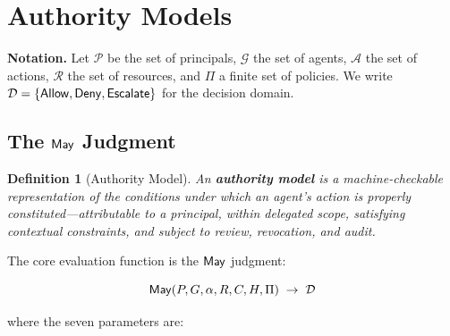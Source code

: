 \documentclass[11pt,a4paper]{article}
\newtheorem{definition}{Definition}[section]
\newcommand{\termlabel}[1]{\ifmmode\mathsf{#1}\else{\normalfont\textsc{\MakeLowercase{#1}}}\fi}
\newcommand{\May}{\termlabel{May}}
\newcommand{\Allow}{\termlabel{Allow}}
\newcommand{\Deny}{\termlabel{Deny}}
\newcommand{\Escalate}{\termlabel{Escalate}}
\begin{document}
\section{Authority Models}
\label{sec:authority}

\noindent\textbf{Notation.} Let $\mathcal{P}$ be the set of principals, $\mathcal{G}$ the set of agents, $\mathcal{A}$ the set of actions, $\mathcal{R}$ the set of resources, and $\Pi$ a finite set of policies. We write $\mathcal{D} = \{\Allow, \Deny, \Escalate\}$ for the decision domain.

\subsection{The \texorpdfstring{$\May$}{May} Judgment}

\begin{definition}[Authority Model]
\label{def:authority-model}
An \textbf{authority model} is a machine-checkable representation of the conditions under which an agent's action is \emph{properly constituted}---attributable to a principal, within delegated scope, satisfying contextual constraints, and subject to review, revocation, and audit.
\end{definition}

The core evaluation function is the $\May$ judgment:

\begin{equation}
\May(P, G, \alpha, R, C, H, \Pi) \;\to\; \mathcal{D}
\label{eq:may}
\end{equation}

\noindent where the seven parameters are:
\end{document}
